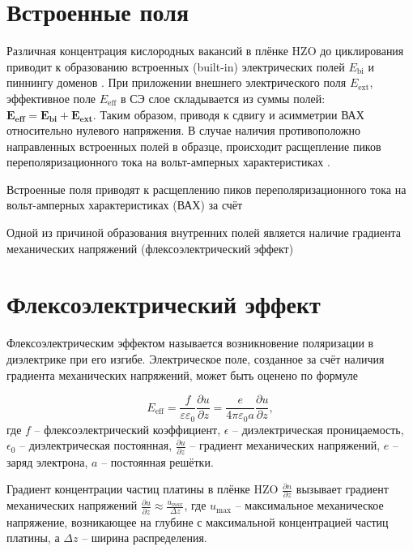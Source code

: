 \section{Встроенные поля}

Различная концентрация кислородных вакансий в плёнке HZO до циклирования приводит к образованию встроенных (built-in) электрических полей \(E_\text{bi}\) \cite{pesicImpactChargeTrapping2016} и пиннингу доменов . При приложении внешнего электрического поля \(E_\text{ext}\), эффективное поле \(E_\text{eff}\) в СЭ слое складывается из суммы полей: \(\boldsymbol{E_\text{eff}} = \boldsymbol{E_\text{bi}} + \boldsymbol{E_\text{ext}}\). Таким образом, приводя к сдвигу и асимметрии ВАХ относительно нулевого напряжения. В случае наличия противоположно направленных встроенных полей в образце, происходит расщепление пиков переполяризационного тока на вольт-амперных характеристиках \cite{schenkElectricFieldCycling2014}.

Встроенные поля приводят к расщеплению пиков переполяризационного тока на вольт-амперных характеристиках (ВАХ) за счёт

Одной из причиной образования внутренних полей является наличие градиента механических напряжений (флексоэлектрический эффект)

\section{Флексоэлектрический эффект}


Флексоэлектрическим эффектом называется возникновение поляризации в диэлектрике при его изгибе. Электрическое поле, созданное за счёт наличия градиента механических напряжений, может быть оценено по формуле \cite{gruvermanMechanicalStressEffect2003}

\[E_\text{eff}=\frac{f}{\varepsilon\varepsilon_0}\frac{\partial u}{\partial z} = \frac{e}{4\pi\varepsilon_0 a}\frac{\partial u}{\partial z},\]
где \(f\) -- флексоэлектрический коэффициент, \(\epsilon\) -- диэлектрическая проницаемость, \(\epsilon_0\) -- диэлектрическая постоянная, \(\frac{\partial u}{\partial z}\) -- градиент механических напряжений, \(e\) -- заряд электрона, \(a\) -- постоянная решётки.

Градиент концентрации частиц платины в плёнке HZO \(\frac{\partial n}{\partial z}\) вызывает градиент механических напряжений \(\frac{\partial u}{\partial z}\approx\frac{u_{max}}{\Delta z}\), где \(u_\text{max}\) -- максимальное механическое напряжение, возникающее на глубине с максимальной концентрацией частиц платины, а \(\Delta z\) -- ширина распределения.

